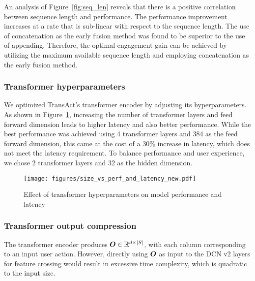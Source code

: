 An analysis of Figure~\ref{fig:seq_len} reveals that there is a positive correlation between sequence length and performance. The performance improvement increases at a rate that is sub-linear with respect to the sequence length. The use of concatenation as the early fusion method was found to be superior to the use of appending. Therefore, the optimal engagement gain can be achieved by utilizing the maximum available sequence length and employing concatenation as the early fusion method.

\subsubsection{Transformer hyperparameters}
We optimized TransAct's transformer encoder by adjusting its hyperparameters. As shown in Figure~\ref{fig:tfmr_hpt},
increasing the number of transformer layers and feed forward dimension leads to higher latency and also better performance.
While the best performance was achieved using 4 transformer layers and 384 as the feed forward dimension, this came at the cost of a 30\% increase in latency, which does not meet the latency requirement.
To balance performance and user experience, we chose 2 transformer layers and 32 as the hidden dimension.
\begin{figure}[h]
  \centering
  \texttt{[image: figures/size\_vs\_perf\_and\_latency\_new.pdf]}
  \caption{Effect of transformer hyperparameters on model performance and latency}
  \label{fig:tfmr_hpt}
\end{figure}


\subsubsection{Transformer output compression}
\label{sec:compression}
The transformer encoder produces $\boldsymbol{O} \in \mathbb{R}^{d \times |S|}$, with each column corresponding to an input user action. 
However, directly using $\boldsymbol{O}$ as input to the DCN v2 layers for feature crossing would result in excessive time complexity, which is quadratic to the input size.

